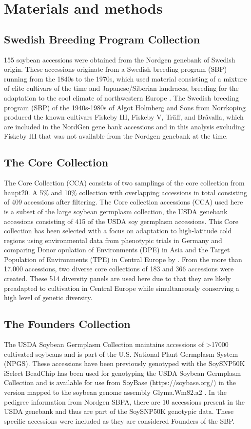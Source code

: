 \documentclass[9pt, twocolumn,twoside]{gsajnl}
\begin{document}
\section{Materials and methods}
\label{sec:materials:methods}

\subsection{Swedish Breeding Program Collection}
155 soybean accessions were obtained from the Nordgen genebank of Swedish origin. These accessions originate from a Swedish breeding program (SBP) running from the 1840s to the 1970s, which used material consisting of a mixture of elite cultivars of the time and Japanese/Siberian landraces, breeding for the adaptation to the cool climate of northwestern Europe \cite{holmberg1973}. The Swedish breeding program (SBP) of the 1940s-1980s of Algot Holmberg and Sons from Norrkoping produced the known cultivars Fiskeby III, Fiskeby V, Träff, and Bråvalla, which are included in the NordGen gene bank accessions and in this analysis excluding Fiskeby III that was not available from the Nordgen genebank at the time.

\subsection{The Core Collection}
The Core Collection (CCA) consists of two samplings of the core collection from haupt20. A 5\% and 10\% collection with overlapping accessions in total consisting of 409 accessions after filtering. 
The Core collection accessions (CCA) used here is a subset of the large soybean germplasm collection, the  USDA genebank accessions consisting of 415 of the USDA soy germplasm accessions. This Core collection has been selected with a focus on adaptation to high-latitude cold regions using environmental data from phenotypic trials in Germany and comparing Donor opulation of Environments (DPE) in Asia and the Target Population of Environments (TPE) in Central Europe by \cite{haupt20}. From the more than 17.000 accessions, two diverse core collections of 183 and 366 accessions were created. These 514 diversity panels are used here due to that they are likely preadapted to cultivation in Central Europe while simultaneously conserving a high level of genetic diversity. 

\subsection{The Founders Collection}
The USDA Soybean Germplasm Collection maintains accessions of >17000 cultivated soybeans and is part of the U.S. National Plant Germplasm System (NPGS).  These accessions have been previously genotyped with the SoySNP50K iSelect BeadChip  \cite{song13,song15} has been used for genotyping the USDA Soybean Germplasm Collection and is available for use from SoyBase (https://soybase.org/) in the version mapped to the soybean genome assembly Glyma.Wm82.a2  \cite{schmutz10}. In the pedigree information from Nordgen SBPA, there are 10 accessions present in the USDA genebank and thus are part of the SoySNP50K genotypic data. These specific accessions were included as they are considered Founders of the SBP. 
\end{document}
